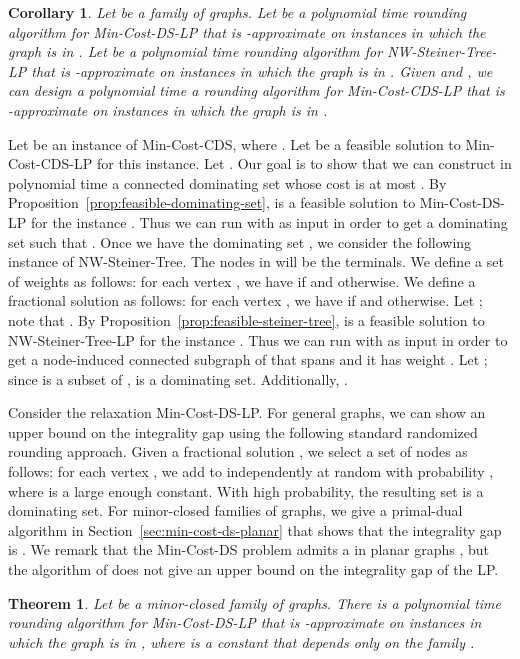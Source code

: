 \documentclass[11pt]{article}
\newtheorem{theorem}[lemma]{Theorem}
\newtheorem{corollary}[lemma]{Corollary}
\renewenvironment{proof}{\vspace{-0.1in}\noindent{\bf Proof:}}{\hspace*{\fill}\par}
\def\prob#1{\textsf{\textup{#1}}\xspace}
\def\minDSlp{\prob{\minDS-LP}}
\def\minCDSlp{\prob{\minCDS-LP}}
\def\nwST{\prob{NW-Steiner-Tree}}
\def\nwSTlp{\prob{\nwST-LP}}
\def\minCDS{\prob{Min-Cost-CDS}}
\def\minDS{\prob{Min-Cost-DS}}
\begin{document}
\begin{corollary}
	Let  be a family of graphs.  Let  be a polynomial
	time rounding algorithm for \minDSlp that is -approximate
	on instances in which the graph is in . Let
	 be a polynomial time rounding algorithm for \nwSTlp that
	is -approximate on instances in which the graph is in .
	Given  and , we can design a
	polynomial time a rounding algorithm for \minCDSlp that is
	-approximate on instances in which the graph is in
	.
\end{corollary}
\begin{proof}
	Let  be an instance of \minCDS, where . Let  be a feasible solution to \minCDSlp for this
	instance. Let . Our goal is to
	show that we can construct in polynomial time a connected
	dominating set  whose cost  is at most
	. By Proposition~\ref{prop:feasible-dominating-set},
	 is a feasible solution to \minDSlp for the instance
	.  Thus we can run  with  as input
	in order to get a dominating set  such that . Once we have the dominating set , we consider the
	following instance of \nwST. The nodes in  will be the
	terminals. We define a set of weights as follows: for each vertex
	, we have  if  and 
	otherwise. We define a fractional solution  as follows: for
	each vertex , we have  if  and
	 otherwise. Let ;
	note that . By
	Proposition~\ref{prop:feasible-steiner-tree},  is a
	feasible solution to \nwSTlp for the instance .
	Thus we can run  with  as input in order to get a
	node-induced connected subgraph  of  that spans  and it
	has weight . Let ; since 
	is a subset of ,  is a dominating set. Additionally,
	.
\end{proof}

\medskip\noindent
Consider the relaxation \minDSlp. For general graphs, we can show an
 upper bound on the integrality gap using the following
standard randomized rounding approach. Given a fractional
solution , we select a set  of nodes as follows: for each
vertex , we add  to  independently at random with
probability , where  is a large
enough constant. With high probability, the resulting set  is a
dominating set. For minor-closed families of graphs, we give a
primal-dual algorithm in Section~\ref{sec:min-cost-ds-planar} that
shows that the integrality gap is . We remark that the \minDS
problem admits a  in planar graphs \cite{Baker94}, but the
algorithm of \cite{Baker94} does not give an upper bound on the
integrality gap of the LP.

\begin{theorem} \label{thm:min-ds-planar-integrality-gap}
	Let  be a minor-closed family of graphs. There is a
	polynomial time rounding algorithm for \minDSlp that is
	-approximate on instances in which the graph is in ,
	where  is a constant that depends only on the family
	.
\end{theorem}
\end{document}
